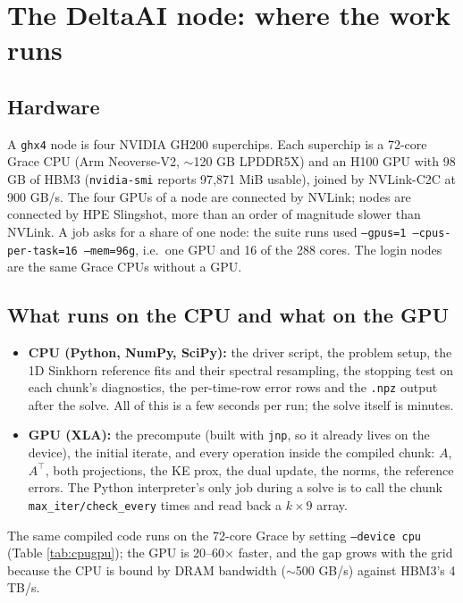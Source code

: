 \documentclass[11pt]{article}
\newcommand{\code}[1]{\texttt{#1}}
\begin{document}
\section{The DeltaAI node: where the work runs}\label{sec:node}

\subsection{Hardware}

A \code{ghx4} node is four NVIDIA GH200 superchips. Each superchip is a 72-core Grace
CPU (Arm Neoverse-V2, $\sim$120 GB LPDDR5X) and an H100 GPU with 98 GB of HBM3
(\code{nvidia-smi} reports 97{,}871 MiB usable), joined by NVLink-C2C at 900 GB/s. The
four GPUs of a node are connected by NVLink; nodes are connected by HPE Slingshot,
more than an order of magnitude slower than NVLink. A job asks for a share of one node:
the suite runs used \code{--gpus=1 --cpus-per-task=16 --mem=96g}, i.e.\ one GPU and
16 of the 288 cores. The login nodes are the same Grace CPUs without a GPU.

\subsection{What runs on the CPU and what on the GPU}

\begin{itemize}
  \item \textbf{CPU (Python, NumPy, SciPy):} the driver script, the problem setup, the
  1D Sinkhorn reference fits and their spectral resampling, the stopping test on each
  chunk's diagnostics, the per-time-row error rows and the \code{.npz} output after
  the solve. All of this is a few seconds per run; the solve itself is minutes.
  \item \textbf{GPU (XLA):} the precompute (built with \code{jnp}, so it already lives on
  the device), the initial iterate, and every operation inside the compiled chunk:
  $A$, $A^{\!\top}$, both projections, the KE prox, the dual update, the norms, the
  reference errors. The Python interpreter's only job during a solve is to call the
  chunk \code{max\_iter/check\_every} times and read back a $k\times 9$ array.
\end{itemize}
The same compiled code runs on the 72-core Grace by setting \code{--device cpu}
(Table \ref{tab:cpugpu}); the GPU is 20--60$\times$ faster, and the gap grows with the
grid because the CPU is bound by DRAM bandwidth ($\sim$500 GB/s) against HBM3's 4 TB/s.
\end{document}
